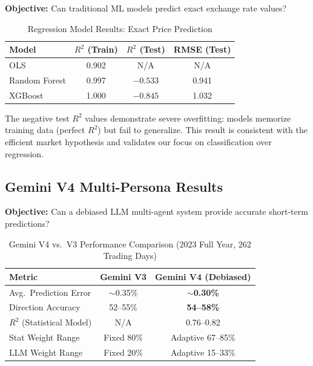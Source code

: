 \documentclass[11pt]{article}
\begin{document}
\textbf{Objective:} Can traditional ML models predict exact exchange rate values?

\begin{table}[H]
\centering
\small
\caption{Regression Model Results: Exact Price Prediction}
\label{tab:regression}
\begin{tabular}{lccc}
\toprule
\textbf{Model} & \textbf{$R^2$ (Train)} & \textbf{$R^2$ (Test)} & \textbf{RMSE (Test)} \\
\midrule
OLS & 0.902 & N/A & N/A \\
Random Forest & 0.997 & $-0.533$ & 0.941 \\
XGBoost & 1.000 & $-0.845$ & 1.032 \\
\bottomrule
\end{tabular}
\end{table}

The negative test $R^2$ values demonstrate severe overfitting: models memorize training data (perfect $R^2$) but fail to generalize. This result is consistent with the efficient market hypothesis and validates our focus on classification over regression.

\subsection{Gemini V4 Multi-Persona Results}

\textbf{Objective:} Can a debiased LLM multi-agent system provide accurate short-term predictions?

\begin{table}[H]
\centering
\small
\caption{Gemini V4 vs.\ V3 Performance Comparison (2023 Full Year, 262 Trading Days)}
\label{tab:gemini}
\begin{tabular}{lcc}
\toprule
\textbf{Metric} & \textbf{Gemini V3} & \textbf{Gemini V4 (Debiased)} \\
\midrule
Avg.\ Prediction Error & $\sim$0.35\% & $\sim$\textbf{0.30\%} \\
Direction Accuracy & 52--55\% & \textbf{54--58\%} \\
$R^2$ (Statistical Model) & N/A & 0.76--0.82 \\
Stat Weight Range & Fixed 80\% & Adaptive 67--85\% \\
LLM Weight Range & Fixed 20\% & Adaptive 15--33\% \\
\bottomrule
\end{tabular}
\end{table}
\end{document}
